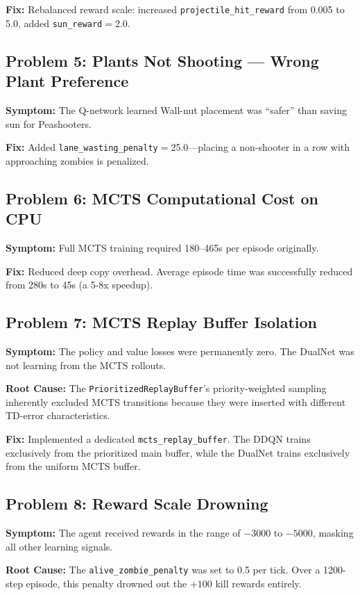 \documentclass[conference]{IEEEtran}
\begin{document}
\textbf{Fix:} Rebalanced reward scale: increased \texttt{projectile\_hit\_reward} from 0.005 to 5.0, added \texttt{sun\_reward}$=$2.0.

\subsection{Problem 5: Plants Not Shooting --- Wrong Plant Preference}
\textbf{Symptom:} The Q-network learned Wall-nut placement was ``safer'' than saving sun for Peashooters.

\textbf{Fix:} Added \texttt{lane\_wasting\_penalty}$=$25.0---placing a non-shooter in a row with approaching zombies is penalized. 

\subsection{Problem 6: MCTS Computational Cost on CPU}
\textbf{Symptom:} Full MCTS training required 180--465s per episode originally.

\textbf{Fix:} Reduced deep copy overhead. Average episode time was successfully reduced from 280s to 45s (a 5-8x speedup).

\subsection{Problem 7: MCTS Replay Buffer Isolation}
\textbf{Symptom:} The policy and value losses were permanently zero. The DualNet was not learning from the MCTS rollouts.

\textbf{Root Cause:} The \texttt{PrioritizedReplayBuffer}'s priority-weighted sampling inherently excluded MCTS transitions because they were inserted with different TD-error characteristics.

\textbf{Fix:} Implemented a dedicated \texttt{mcts\_replay\_buffer}. The DDQN trains exclusively from the prioritized main buffer, while the DualNet trains exclusively from the uniform MCTS buffer.

\subsection{Problem 8: Reward Scale Drowning}
\textbf{Symptom:} The agent received rewards in the range of $-3000$ to $-5000$, masking all other learning signals.

\textbf{Root Cause:} The \texttt{alive\_zombie\_penalty} was set to 0.5 per tick. Over a 1200-step episode, this penalty drowned out the $+100$ kill rewards entirely.
\end{document}
